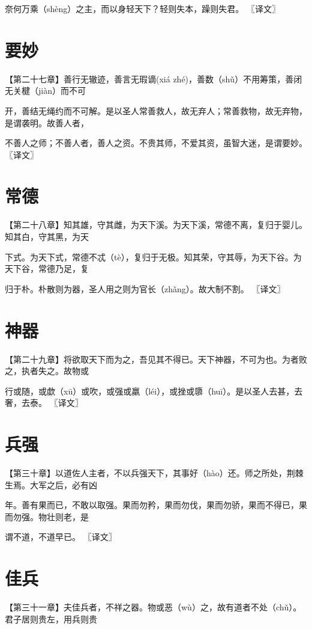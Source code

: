 \documentclass[a4paper,12pt,UTF8,twoside]{ctexbook}
\begin{document}
	奈何万乘（shèng）之主，而以身轻天下？轻则失本，躁则失君。 〖译文〗
	
	
	
	
	\chapter{要妙}
	
	【第二十七章】善行无辙迹，善言无瑕谪(xiá zhé)，善数（shǔ）不用筹策，善闭无关楗（jiàn）而不可
	
	开，善结无绳约而不可解。是以圣人常善救人，故无弃人；常善救物，故无弃物，是谓袭明。故善人者，
	
	不善人之师；不善人者，善人之资。不贵其师，不爱其资，虽智大迷，是谓要妙。 〖译文〗
	
	
	
	\chapter{常德}
	
	【第二十八章】知其雄，守其雌，为天下溪。为天下溪，常德不离，复归于婴儿。知其白，守其黑，为天
	
	下式。为天下式，常德不忒（tè），复归于无极。知其荣，守其辱，为天下谷。为天下谷，常德乃足，复
	
	归于朴。朴散则为器，圣人用之则为官长（zhǎng）。故大制不割。 〖译文〗
	
	

	\chapter{神器}
		
	【第二十九章】将欲取天下而为之，吾见其不得已。天下神器，不可为也。为者败之，执者失之。故物或
	
	行或随，或歔（xū）或吹，或强或羸（léi），或挫或隳（huī）。是以圣人去甚，去奢，去泰。 〖译文〗
	
	
	

	\chapter{兵强}
		【第三十章】以道佐人主者，不以兵强天下，其事好（hào）还。师之所处，荆棘生焉。大军之后，必有凶
	
	年。善有果而已，不敢以取强。果而勿矜，果而勿伐，果而勿骄，果而不得已，果而勿强。物壮则老，是
	
	谓不道，不道早已。 〖译文〗
	
	
	
	
	\chapter{佳兵}
	【第三十一章】夫佳兵者，不祥之器。物或恶（wù）之，故有道者不处（chǔ）。君子居则贵左，用兵则贵
	
\end{document}
